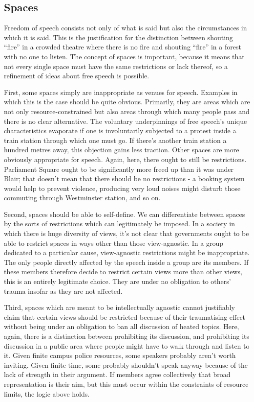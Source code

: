 \documentclass[10pt,a4paper,twoside]{article}
\begin{document}
\begin{multicols}{2}
\section{Spaces}

Freedom of speech consists not only of what is said but also the
circumstances in which it is said. This is the justification for the
distinction between shouting ``fire'' in a crowded theatre where there
is no fire and shouting ``fire'' in a forest with no one to listen. The
concept of spaces is important, because it means that not every single
space must have the same restrictions or lack thereof, so a refinement
of ideas about free speech is possible.

First, some spaces simply are inappropriate as venues for speech.
Examples in which this is the case should be quite obvious. Primarily,
they are areas which are not only resource-constrained but also areas
through which many people pass and there is no clear alternative. The
voluntary underpinnings of free speech's unique characteristics
evaporate if one is involuntarily subjected to a protest inside a train
station through which one must go. If there's another train station a
hundred metres away, this objection gains less traction. Other spaces
are more obviously appropriate for speech. Again, here, there ought to
still be restrictions. Parliament Square ought to be significantly more
freed up than it was under Blair; that doesn't mean that there should be
no restrictions - a booking system would help to prevent violence,
producing very loud noises might disturb those commuting through
Westminster station, and so on.

Second, spaces should be able to self-define. We can differentiate
between spaces by the sorts of restrictions which can legitimately be
imposed. In a society in which there is huge diversity of views, it's
not clear that governments ought to be able to restrict spaces in ways
other than those view-agnostic. In a group dedicated to a particular
cause, view-agnostic restrictions might be inappropriate. The only
people directly affected by the speech inside a group are its members.
If these members therefore decide to restrict certain views more than
other views, this is an entirely legitimate choice. They are under no
obligation to others' trauma insofar as they are not affected.

Third, spaces which are meant to be intellectually agnostic cannot
justifiably claim that certain views should be restricted because of
their traumatising effect without being under an obligation to ban all
discussion of heated topics. Here, again, there is a distinction between
prohibiting its discussion, and prohibiting its discussion in a public
area where people might have to walk through and listen to it. Given
finite campus police resources, some speakers probably aren't worth
inviting. Given finite time, some probably shouldn't speak anyway
because of the lack of strength in their argument. If members agree
collectively that broad representation is their aim, but this must occur
within the constraints of resource limits, the logic above holds.


\end{multicols}
\end{document}
